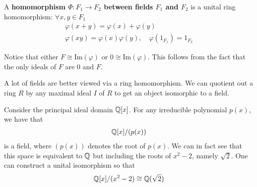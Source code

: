 \documentclass{memoir}
\begin{document}
\begin{defn}
	A \textbf{homomorphism \(\Phi:F_1\to F_2\) between fields \(F_1\) and \(F_2\)} is a unital ring homomorphism: \(\forall x,y \in F_1\)
	\begin{align*}
		\varphi (x+y) = \varphi (x) + \varphi (y)\\
		\varphi (xy) = \varphi (x) \varphi (y), \quad \varphi (1_{F_1}) = 1_{F_2}
	\end{align*}
\end{defn}
Notice that either \(F \cong \textrm{Im}(\varphi )\) or \(0 \cong \textrm{Im}(\varphi )\). This follows from the fact that the only ideals of \(F\) are \(0\) and \(F\).

A lot of fields are better viewed via a ring homomorphism. We can quotient out a ring \(R\) by any maximal ideal \(I\) of \(R\) to get an object isomorphic to a field.
\begin{exmp}
	Consider the principal ideal domain \(\mathbb{Q}[x]\). For any irreducible polynomial \(p(x)\), we have that
	\begin{align*}
		\mathbb{Q}[x] / (p(x))
	\end{align*}
	is a field, where \((p(x))\) denotes the root of \(p(x)\). We can in fact see that this space is equivalent to \(\mathbb{Q}\) but including the roots of \(x^2-2\), namely \(\sqrt{2} \). One can construct a unital isomorphism so that
	\begin{align*}
		\mathbb{Q}[x] / (x^2-2) \cong \mathbb{Q}(\sqrt{2} )
	\end{align*}
\end{exmp}
\end{document}
